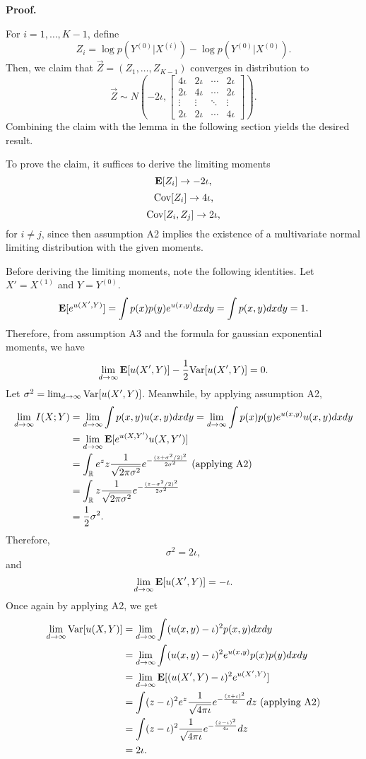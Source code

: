 \documentclass[12pt]{article}
\begin{document}
\textbf{Proof.}

For $i = 1,\hdots, K-1$, define
\[
Z_i = \log p(Y^{(0)}|X^{(i)}) - \log p(Y^{(0)}|X^{(0)}).
\]
Then, we claim that $\vec{Z} = (Z_1,\hdots, Z_{K-1})$ converges in distribution to
\[
\vec{Z} \sim N\left(-2\iota, 
\begin{bmatrix}
4\iota & 2\iota & \cdots & 2\iota\\
2\iota & 4\iota & \cdots & 2\iota\\
\vdots & \vdots & \ddots & \vdots\\
2\iota & 2\iota & \cdots & 4\iota
\end{bmatrix}
\right).
\]
Combining the claim with the lemma in the following section yields the
desired result.

To prove the claim, it suffices to derive the limiting moments
\[\textbf{E}[Z_i] \to -2\iota,\]
\[\text{Cov}[Z_i] \to 4\iota,\]
\[\text{Cov}[Z_i, Z_j] \to 2\iota,\]
for $i \neq j$,
since then assumption A2 implies the existence of a multivariate normal
limiting distribution with the given moments.

Before deriving the limiting moments, note the following identities.
Let $X' = X^{(1)}$ and $Y = Y^{(0)}$.
\[
\textbf{E}[e^{u(X', Y)}] = \int p(x) p(y) e^{u(x, y)} dx dy = \int p(x, y) dx dy = 1.
\]
Therefore, from assumption A3 and the formula for gaussian exponential
moments, we have
\[
\lim_{d \to \infty} \textbf{E}[u(X', Y)]-\frac{1}{2}\text{Var}[u(X', Y)] = 0.
\]
Let $\sigma^2 = \lim_{d \to \infty} \text{Var}[u(X', Y)]$.
Meanwhile, by applying assumption A2,
\begin{align*}
\lim_{d \to \infty} I(X; Y) &= \lim_{d \to \infty} \int p(x, y) u(x, y) dx dy 
= \lim_{d \to \infty} \int p(x) p(y) e^{u(x, y)} u(x, y) dx dy
\\&= \lim_{d \to \infty}  \textbf{E}[e^{u(X, Y')}u(X, Y')]
\\&= \int_{\mathbb{R}} e^z z \frac{1}{\sqrt{2\pi \sigma^2}} 
e^{-\frac{(z + \sigma^2/2)^2}{2\sigma^2}} \text{ (applying A2)}
\\&= \int_{\mathbb{R}} z \frac{1}{\sqrt{2\pi \sigma^2}} 
e^{-\frac{(z - \sigma^2/2)^2}{2\sigma^2}}
\\&= \frac{1}{2}\sigma^2.
\end{align*}
Therefore,
\[
\sigma^2 = 2\iota,
\]
and
\[
\lim_{d \to \infty} \textbf{E}[u(X', Y)] = -\iota.
\]
Once again by applying A2, we get
\begin{align*}
\lim_{d \to \infty} \text{Var}[u(X, Y)] 
&= \lim_{d \to \infty} \int (u(x, y) - \iota)^2 p(x, y) dx dy
\\&= \lim_{d \to \infty} \int (u(x, y) - \iota)^2 e^{u(x, y)} p(x) p(y) dx dy
\\&= \lim_{d \to \infty} \textbf{E}[(u(X', Y) - \iota)^2 e^{u(X', Y)}] 
\\&= \int (z - \iota)^2 e^z \frac{1}{\sqrt{4\pi\iota}} e^{-\frac{(z+\iota)^2}{4\iota}} dz \text{ (applying A2)}
\\&= \int (z - \iota)^2 \frac{1}{\sqrt{4\pi\iota}} e^{-\frac{(z-\iota)^2}{4\iota}} dz
\\&= 2\iota.
\end{align*}
\end{document}
